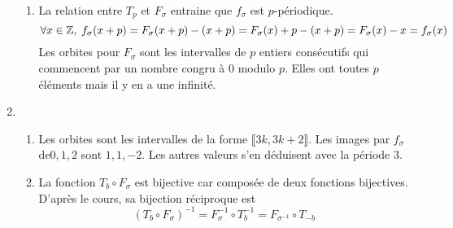 \begin{enumerate}
\begin{enumerate}
\item La relation entre $T_p$ et $F_\sigma$ entraine que $f_\sigma$ est $p$-périodique.
\begin{displaymath}
\forall x \in\mathbb{Z}, \; f_\sigma(x+p) = F_\sigma(x+p) - (x+p) = F_\sigma(x) +p -(x+p) = F_\sigma(x) -x = f_\sigma(x) 
\end{displaymath}
Les orbites pour $F_\sigma$ sont les intervalles de $p$ entiers consécutifs qui commencent par un nombre congru à $0$ modulo $p$. Elles ont toutes $p$ éléments mais il y en a une infinité.
\end{enumerate} 

 \item 
\begin{enumerate}
 \item Les orbites sont les intervalles de la forme $\llbracket 3k,3k+2\rrbracket$. Les images par $f_\sigma$ de$0 , 1, 2$ sont $1, 1, -2$. Les autres valeurs s'en déduisent avec la période $3$.
 
 \item La fonction $T_b \circ F_\sigma$ est bijective car composée de deux fonctions bijectives. D'après le cours, sa bijection réciproque est
\begin{displaymath}
 (T_b \circ F_\sigma)^{-1} = F_{\sigma}^{-1} \circ T_b^{-1} = F_{\sigma^{-1}} \circ T_{-b}
\end{displaymath}

\end{enumerate}
 

\end{enumerate}
